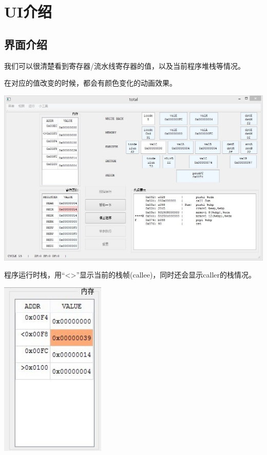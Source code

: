\documentclass{article}
\begin{document}
\section{UI介绍}
\subsection{界面介绍}
我们可以很清楚看到寄存器/流水线寄存器的值，以及当前程序堆栈等情况。

在对应的值改变的时候，都会有颜色变化的动画效果。
\begin{center}
\includegraphics[width = 15cm]{2.jpg}
\end{center}

\begin{center}
程序运行时栈，用“<>”显示当前的栈帧(callee)，同时还会显示caller的栈情况。

\includegraphics[width = 5cm]{3.jpg}
\end{center}
\end{document}
